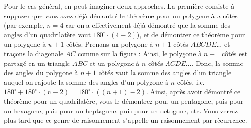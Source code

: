 \begin{preuve}
Pour le cas général, on peut imaginer deux approches. La première consiste à supposer que vous avez déjà démontré le théorème pour un polygone à $n$ côtés (par exemple, $n=4$ car on a effectivement déjà démontré que la somme des angles d'un quadrilatère vaut $180^\circ \cdot (4-2)$), et de démontrer ce théorème pour un polygone à $n+1$ côtés. Prenons un polygone à $n+1$ côtés $ABCDE...$ et traçons la diagonale $AC$ comme sur la figure :
\newline
Ainsi, le polygone à $n+1$ côtés est partagé en un triangle $ABC$ et un polygone à $n$ côtés $ACDE...$. Donc, la somme des angles du polygone à $n+1$ côtés vaut la somme des angles d'un triangle auquel on rajoute la somme des angles d'un polygone à $n$ côtés, i.e. $180^\circ+180^\circ\cdot(n-2)=180^\circ\cdot((n+1)-2)$. Ainsi, après avoir démontré ce théorème pour un quadrilatère, vous le démontrez pour un pentagone, puis pour un hexagone, puis pour un heptagone, puis pour un octogone, etc. Vous verrez plus tard que ce genre de raisonnement s'appelle un raisonnement par récurrence.


\end{preuve}
